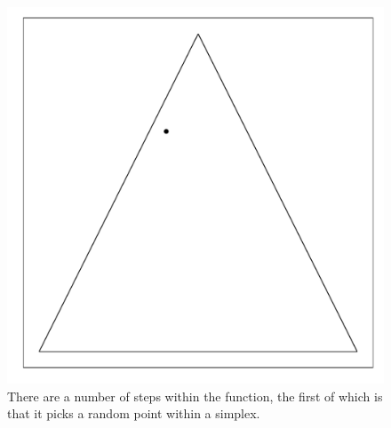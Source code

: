 \documentclass{article}\usepackage{graphicx, color}
\makeatletter
\def\maxwidth{ %
  \ifdim\Gin@nat@width>\linewidth
    \linewidth
  \else
    \Gin@nat@width
  \fi
}
\newenvironment{knitrout}{}{} %
\makeatother
\begin{document}
\begin{figure}[H]
\begin{knitrout}
\color{fgcolor}
\includegraphics[width=\maxwidth]{figure/hitandrun_walkthrough1} 

\end{knitrout}

\caption{There are a number of steps within the function, the first of which is that it picks a random point within a simplex.}
\end{figure}
\end{document}
